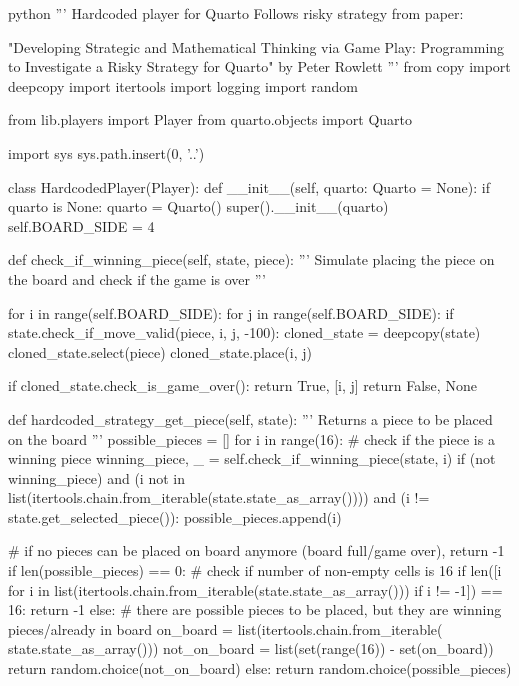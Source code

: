 \begin{mintedbox}{python}
'''
Hardcoded player for Quarto
Follows risky strategy from paper:

"Developing Strategic and Mathematical Thinking via Game Play:
Programming to Investigate a Risky Strategy for Quarto"
by Peter Rowlett
'''
from copy import deepcopy
import itertools
import logging
import random

from lib.players import Player
from quarto.objects import Quarto

import sys
sys.path.insert(0, '..')

class HardcodedPlayer(Player):
    def __init__(self, quarto: Quarto = None):
        if quarto is None:
            quarto = Quarto()
        super().__init__(quarto)
        self.BOARD_SIDE = 4

    def check_if_winning_piece(self, state, piece):
        '''
        Simulate placing the piece on the board and check if the game is over
        '''

        for i in range(self.BOARD_SIDE):
            for j in range(self.BOARD_SIDE):
                if state.check_if_move_valid(piece, i, j, -100):
                    cloned_state = deepcopy(state)
                    cloned_state.select(piece)
                    cloned_state.place(i, j)

                    if cloned_state.check_is_game_over():
                        return True, [i, j]
        return False, None

    def hardcoded_strategy_get_piece(self, state):
        '''
        Returns a piece to be placed on the board
        '''
        possible_pieces = []
        for i in range(16):
            # check if the piece is a winning piece
            winning_piece, _ = self.check_if_winning_piece(state, i)
            if (not winning_piece) and (i not in list(itertools.chain.from_iterable(state.state_as_array()))) and (i != state.get_selected_piece()):
                possible_pieces.append(i)

        # if no pieces can be placed on board anymore (board full/game over), return -1
        if len(possible_pieces) == 0:
            # check if number of non-empty cells is 16
            if len([i for i in list(itertools.chain.from_iterable(state.state_as_array())) if i != -1]) == 16:
                return -1
            else:
                # there are possible pieces to be placed, but they are winning pieces/already in board
                on_board = list(itertools.chain.from_iterable(
                    state.state_as_array()))
                not_on_board = list(set(range(16)) - set(on_board))
                return random.choice(not_on_board)
        else:
            return random.choice(possible_pieces)


\end{mintedbox}
